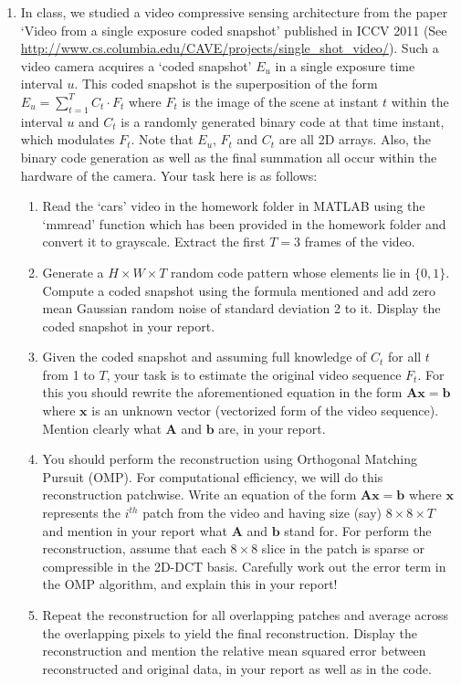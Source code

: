 \documentclass[11pt]{article}
\begin{document}
\begin{enumerate}
\item In class, we studied a video compressive sensing architecture from the paper `Video from a single exposure coded snapshot' published in ICCV 2011 (See \url{http://www.cs.columbia.edu/CAVE/projects/single_shot_video/}). Such a video camera acquires a `coded snapshot' $E_u$ in a single exposure time interval $u$. This coded snapshot is the superposition of the form $E_u = \sum_{t=1}^T C_t \cdot F_t$ where $F_t$ is the image of the scene at instant $t$ within the interval $u$ and $C_t$ is a randomly generated binary code at that time instant, which modulates $F_t$. Note that $E_u$, $F_t$ and $C_t$ are all 2D arrays. Also, the binary code generation as well as the final summation all occur within the hardware of the camera. Your task here is as follows:
\begin{enumerate}
\item Read the `cars' video in the homework folder in MATLAB using the `mmread' function which has been provided in the homework folder and convert it to grayscale. Extract the first $T = 3$ frames of the video.
\item Generate a $H \times W \times T$ random code pattern whose elements lie in $\{0,1\}$. Compute a coded snapshot using the formula mentioned and add zero mean Gaussian random noise of standard deviation 2 to it. Display the coded snapshot in your report.
\item Given the coded snapshot and assuming full knowledge of $C_t$ for all $t$ from 1 to $T$, your task is to estimate the original video sequence $F_t$. For this you should rewrite the aforementioned equation in the form $\boldsymbol{Ax} = \boldsymbol{b}$ where $\boldsymbol{x}$ is an unknown vector (vectorized form of the video sequence). Mention clearly what $\boldsymbol{A}$ and $\boldsymbol{b}$ are, in your report.
\item You should perform the reconstruction using Orthogonal Matching Pursuit (OMP). For computational efficiency, we will do this reconstruction patchwise. Write an equation of the form $\boldsymbol{Ax} = \boldsymbol{b}$ where $\boldsymbol{x}$ represents the $i^{th}$ patch from the video and having size (say) $8 \times 8 \times T$ and mention in your report what $\boldsymbol{A}$ and $\boldsymbol{b}$ stand for. For perform the reconstruction, assume that each $8 \times 8$ slice in the patch is sparse or compressible in the 2D-DCT basis. Carefully work out the error term in the OMP algorithm, and explain this in your report!
\item Repeat the reconstruction for all overlapping patches and average across the overlapping pixels to yield the final reconstruction. Display the reconstruction and mention the relative mean squared error between reconstructed and original data, in your report as well as in the code. 

\end{enumerate}
\end{enumerate}
\end{document}
